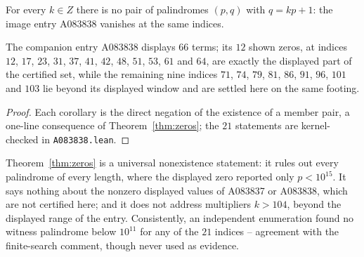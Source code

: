 \begin{corollary}
\label{cor:zeros838}
For every $k \in Z$ there is no pair of palindromes
$(p,q)$ with $q = kp+1$: the image entry A083838
vanishes at the same indices.
\end{corollary}

The companion entry A083838 displays $66$ terms; its
$12$ shown zeros, at indices $12$, $17$, $23$, $31$,
$37$, $41$, $42$, $48$, $51$, $53$, $61$ and $64$, are
exactly the displayed part of the certified set, while
the remaining nine indices $71$, $74$, $79$, $81$,
$86$, $91$, $96$, $101$ and $103$ lie beyond its
displayed window and are settled here on the same
footing.

\begin{proof}
Each corollary is the direct negation of the existence
of a member pair, a one-line consequence of
Theorem~\ref{thm:zeros}; the $21$ statements are
kernel-checked in \texttt{A083838.lean}.
\end{proof}

\begin{remark}
\label{rem:scopezeros}
Theorem~\ref{thm:zeros} is a universal nonexistence
statement: it rules out every palindrome of every
length, where the displayed zero reported only
$p < 10^{15}$. It says nothing about the nonzero
displayed values of A083837 or A083838, which are not
certified here; and it does not address multipliers
$k > 104$, beyond the displayed range of the entry.
Consistently, an independent enumeration found no
witness palindrome below $10^{11}$ for any of the $21$
indices -- agreement with the finite-search comment,
though never used as evidence.
\end{remark}
